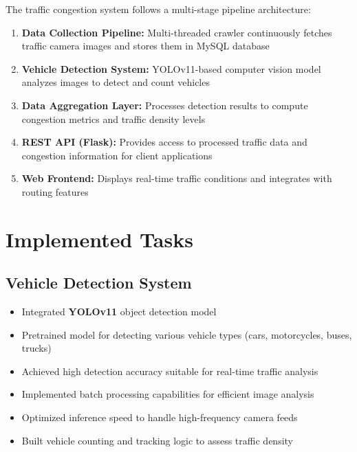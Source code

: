 The traffic congestion system follows a multi-stage pipeline architecture:

\begin{enumerate}
    \item \textbf{Data Collection Pipeline:} Multi-threaded crawler continuously fetches traffic camera images and stores them in MySQL database
    
    \item \textbf{Vehicle Detection System:} YOLOv11-based computer vision model analyzes images to detect and count vehicles
    
    \item \textbf{Data Aggregation Layer:} Processes detection results to compute congestion metrics and traffic density levels
    
    \item \textbf{REST API (Flask):} Provides access to processed traffic data and congestion information for client applications
    
    \item \textbf{Web Frontend:} Displays real-time traffic conditions and integrates with routing features
\end{enumerate}
    
\section{Implemented Tasks}

\subsection{Vehicle Detection System}

\begin{itemize}
    \item Integrated \textbf{YOLOv11} object detection model
    \item Pretrained model for detecting various vehicle types (cars, motorcycles, buses, trucks)
    \item Achieved high detection accuracy suitable for real-time traffic analysis
    \item Implemented batch processing capabilities for efficient image analysis
    \item Optimized inference speed to handle high-frequency camera feeds
    \item Built vehicle counting and tracking logic to assess traffic density
\end{itemize}

